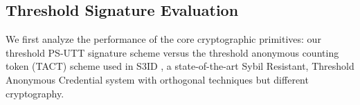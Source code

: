 \subsection{Threshold Signature Evaluation}
We first analyze the performance of the core cryptographic primitives: our threshold PS-UTT signature scheme versus the threshold anonymous counting token (TACT) scheme used in S3ID \cite{rabaninejad_attribute-based_2024}, a state-of-the-art Sybil Resistant, Threshold Anonymous Credential system with orthogonal techniques but different cryptography.

